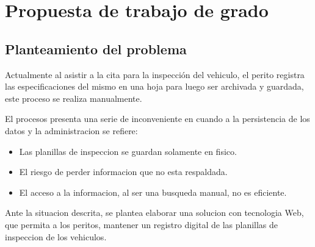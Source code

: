 \chapter{Propuesta de trabajo de grado}

\section{Planteamiento del problema}
\setlength{\parskip}{5mm}


Actualmente al asistir a la cita para la inspección del vehiculo, el perito registra las especificaciones del mismo en una hoja para luego ser archivada y guardada, este proceso se realiza manualmente.

El procesos presenta una serie de inconveniente en cuando a la persistencia de los datos y la administracion se refiere:

\begin{itemize}

	\item Las planillas de inspeccion se guardan solamente en fisico.

	\item El riesgo de perder informacion que no esta respaldada.

	\item El acceso a la informacion, al ser una busqueda manual, no es eficiente. 

\end{itemize}


Ante la situacion descrita, se plantea elaborar una solucion con tecnologia Web, que permita a los peritos, mantener un registro digital de las planillas de inspeccion de los vehiculos.







